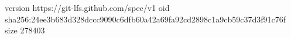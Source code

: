 version https://git-lfs.github.com/spec/v1
oid sha256:24ee3b683d328dccc9090c6dfb60a42a69fa92cd2898c1a9cb59c37d3f91c76f
size 278403
